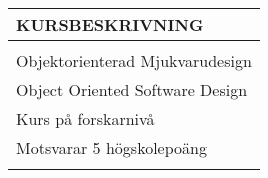 \documentclass[10pt]{article}
\title{}
\author{Mikael Svahnberg\\
Blekinge Institute of Technology\\
SE-371 79 Karlskrona SWEDEN\\
Mikael.Svahnberg@bth.se}
\begin{document}
\begin{minipage}[t]{\textwidth}
  \centering
  \begin{tabular}{C{\textwidth}}
    {\huge KURSBESKRIVNING}\\
    \hline
    {\small}\\
    {\large Objektorienterad Mjukvarudesign}\\
    {\large Object Oriented Software Design}\\
    {\large Kurs på forskarnivå}\\
    {\large Motsvarar 5 högskolepoäng}\\
    {\small}\\
    \hline
  \end{tabular}
\end{minipage}
\end{document}
